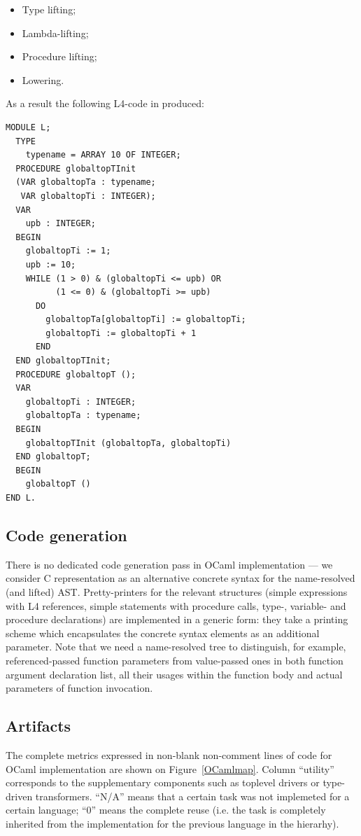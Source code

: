 \begin{itemize}
\item Type lifting;
\item Lambda-lifting;
\item Procedure lifting;
\item Lowering.
\end{itemize}

As a result the following L4-code in produced:

\begin{lstlisting}[language=oberon0]
MODULE L;
  TYPE
    typename = ARRAY 10 OF INTEGER;
  PROCEDURE globaltopTInit 
  (VAR globaltopTa : typename; 
   VAR globaltopTi : INTEGER);
  VAR
    upb : INTEGER;
  BEGIN
    globaltopTi := 1; 
    upb := 10; 
    WHILE (1 > 0) & (globaltopTi <= upb) OR 
          (1 <= 0) & (globaltopTi >= upb)
      DO
        globaltopTa[globaltopTi] := globaltopTi; 
        globaltopTi := globaltopTi + 1
      END
  END globaltopTInit;
  PROCEDURE globaltopT ();
  VAR
    globaltopTi : INTEGER;
    globaltopTa : typename;
  BEGIN
    globaltopTInit (globaltopTa, globaltopTi)
  END globaltopT;
  BEGIN
    globaltopT ()
END L.
\end{lstlisting}

\subsection{Code generation}

There is no dedicated code generation pass in OCaml implementation --- we consider C representation
as an alternative concrete syntax for the name-resolved (and lifted) AST. Pretty-printers for the relevant
structures (simple expressions with L4 references, simple statements with procedure calls, 
type-, variable- and procedure declarations) are implemented in a generic form: they take a
printing scheme which encapsulates the concrete syntax elements as an additional
parameter. Note that we need a name-resolved tree to distinguish, for example, referenced-passed
function parameters from value-passed ones in both function argument declaration list, all
their usages within the function body and actual parameters of function invocation.

\subsection{Artifacts}

The complete metrics expressed in non-blank non-comment lines of code for OCaml implementation are 
shown on Figure~\ref{OCamlmap}. Column ``utility'' corresponds to the supplementary components 
such as toplevel drivers or type-driven transformers. ``N/A'' means that a certain task was not implemeted 
for a certain language; ``0'' means the complete reuse (i.e. the task is completely inherited from the 
implementation for the previous language in the hierarhy).

